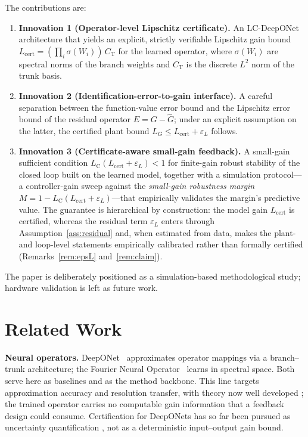 \documentclass[11pt,sagev,times]{sagej}
\newcommand{\Ltwo}{L^2}
\newcommand{\Ghat}{\hat{G}}
\newcommand{\Lhat}{L_{\mathrm{cert}}}
\newcommand{\epsL}{\varepsilon_L}
\newcommand{\LC}{L_{\mathrm{C}}}
\begin{document}
The contributions are:
\begin{enumerate}
  \item \textbf{Innovation 1 (Operator-level Lipschitz certificate).} An
  LC-DeepONet architecture that yields an
  explicit, strictly verifiable Lipschitz gain bound
  $\Lhat=(\prod_i \sigma(W_i))\, C_{\mathrm{T}}$ for the learned operator,
  where $\sigma(W_i)$ are spectral norms of the branch weights and
  $C_{\mathrm{T}}$ is the discrete $\Ltwo$ norm of the trunk basis.
  \item \textbf{Innovation 2 (Identification-error-to-gain interface).} A
  careful separation between the
  function-value error bound and the Lipschitz error bound of the residual
  operator $E=G-\Ghat$; under an explicit assumption on the latter, the
  certified plant bound $L_G\le\Lhat+\epsL$ follows.
  \item \textbf{Innovation 3 (Certificate-aware small-gain feedback).} A
  small-gain sufficient condition
  $\LC(\Lhat+\epsL)<1$ for finite-gain robust stability of the closed loop
  built on the learned model, together with a simulation protocol---a
  controller-gain sweep against the \emph{small-gain robustness margin}
  $M=1-\LC(\Lhat+\epsL)$---that empirically validates the margin's predictive
  value. The guarantee is hierarchical by construction: the model gain
  $\Lhat$ is certified, whereas the residual term $\epsL$ enters through
  Assumption~\ref{ass:residual} and, when estimated from data, makes the
  plant- and loop-level statements empirically calibrated rather than
  formally certified (Remarks~\ref{rem:epsL} and~\ref{rem:claim}).
\end{enumerate}

The paper is deliberately positioned as a simulation-based methodological
study; hardware validation is left as future work.

\section{Related Work}\label{sec:related}

\textbf{Neural operators.} DeepONet~\citep{lu2021deeponet} approximates
operator mappings via a branch--trunk architecture; the Fourier Neural
Operator~\citep{li2021fno} learns in spectral space. Both serve here as
baselines and as the method backbone. This line targets approximation
accuracy and resolution transfer, with theory now well developed
\citep{lanthaler2022error}; the
trained operator carries no computable gain information that a feedback design
could consume. Certification for DeepONets has so far been pursued as
uncertainty quantification \citep{moya2025conformal}, not as a deterministic
input--output gain bound.
\end{document}
